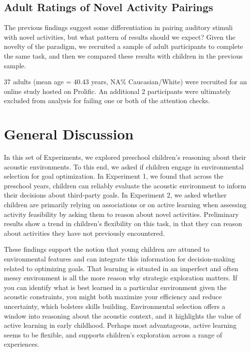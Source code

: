 \documentclass[10pt, letterpaper]{article}
\begin{document}
\hypertarget{adult-ratings-of-novel-activity-pairings}{%
\subsection{Adult Ratings of Novel Activity
Pairings}\label{adult-ratings-of-novel-activity-pairings}}

The previous findings suggest some differentiation in pairing auditory
stimuli with novel activities, but what pattern of results should we
expect? Given the novelty of the paradigm, we recruited a sample of
adult participants to complete the same task, and then we compared these
results with children in the previous sample.

37 adults (mean age = 40.43 years, NA\% Caucasian/White) were recruited
for an online study hosted on Prolific. An additional 2 participants
were ultimately excluded from analysis for failing one or both of the
attention checks.

\hypertarget{general-discussion}{%
\section{General Discussion}\label{general-discussion}}

In this set of Experiments, we explored preschool children's reasoning
about their acoustic environments. To this end, we asked if children
engage in environmental selection for goal optimization. In Experiment
1, we found that across the preschool years, children can reliably
evaluate the acoustic environment to inform their decisions about
third-party goals. In Experiment 2, we asked whether children are
primarily relying on associations or on active learning when assessing
activity feasibility by asking them to reason about novel activities.
Preliminary results show a trend in children's flexibility on this task,
in that they can reason about activities they have not previously
encountered.

These findings support the notion that young children are attuned to
environmental features and can integrate this information for
decision-making related to optimizing goals. That learning is situated
in an imperfect and often messy environment is all the more reason why
strategic exploration matters. If you can identify what is best learned
in a particular environment given the acoustic constraints, you might
both maximize your efficiency and reduce uncertainty, which bolsters
skills building. Environmental selection offers a window into reasoning
about the acoustic context, and it highlights the value of active
learning in early childhood. Perhaps most advantageous, active learning
seems to be flexible, and supports children's exploration across a range
of experiences.
\end{document}
